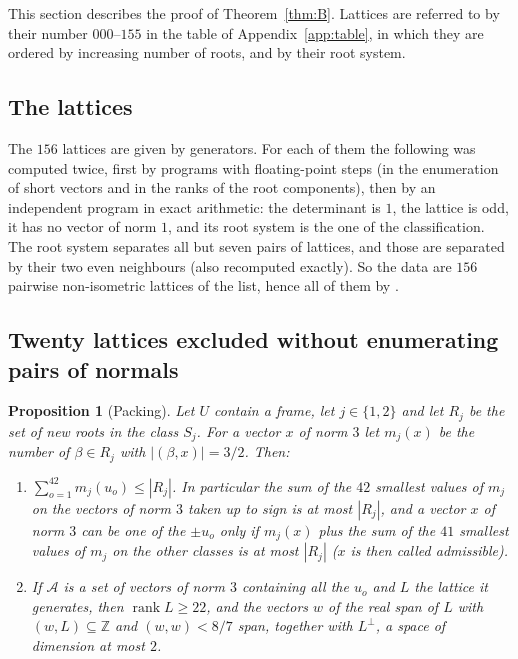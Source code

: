 \documentclass[11pt]{amsart}
\newtheorem{proposition}[theorem]{Proposition}
\theoremstyle{definition}
\theoremstyle{remark}
\newcommand{\Z}{\mathbb{Z}}
\newcommand{\rk}{\operatorname{rank}}
\begin{document}
This section describes the proof of Theorem~\ref{thm:B}. Lattices are referred to by their number $000$--$155$ in the table
of Appendix~\ref{app:table}, in which they are ordered by increasing number of roots, and by their root system.

\subsection{The lattices}
The $156$ lattices are given by generators. For each of them the following was computed twice, first by programs with
floating-point steps (in the enumeration of short vectors and in the ranks of the root components), then by an independent
program in exact arithmetic: the determinant is $1$, the lattice is odd, it has no vector of norm $1$, and its root system
is the one of the classification. The root system separates all but seven pairs of lattices, and those are separated by
their two even neighbours (also recomputed exactly). So the data are $156$ pairwise non-isometric lattices of the list,
hence all of them by \cite{Bor}.

\subsection{Twenty lattices excluded without enumerating pairs of normals}

\begin{proposition}[Packing]\label{prop:pack}
Let $U$ contain a frame, let $j\in\{1,2\}$ and let $R_j$ be the set of new roots in the class $S_j$. For a vector $x$ of
norm $3$ let $m_j(x)$ be the number of $\beta\in R_j$ with $|(\beta,x)|=3/2$. Then:
\begin{enumerate}[label=\textup{(\alph*)}]
\item $\sum_{o=1}^{42}m_j(u_o)\le|R_j|$. In particular the sum of the $42$ smallest values of $m_j$ on the vectors of norm
$3$ taken up to sign is at most $|R_j|$, and a vector $x$ of norm $3$ can be one of the $\pm u_o$ only if $m_j(x)$ plus the
sum of the $41$ smallest values of $m_j$ on the other classes is at most $|R_j|$ \textup{(}$x$ is then called
\emph{admissible}\textup{)}.
\item If $\mathcal A$ is a set of vectors of norm $3$ containing all the $u_o$ and $L$ the lattice it generates, then
$\rk L\ge22$, and the vectors $w$ of the real span of $L$ with $(w,L)\subseteq\Z$ and $(w,w)<8/7$ span, together with
$L^\perp$, a space of dimension at most $2$.
\end{enumerate}
\end{proposition}
\end{document}
